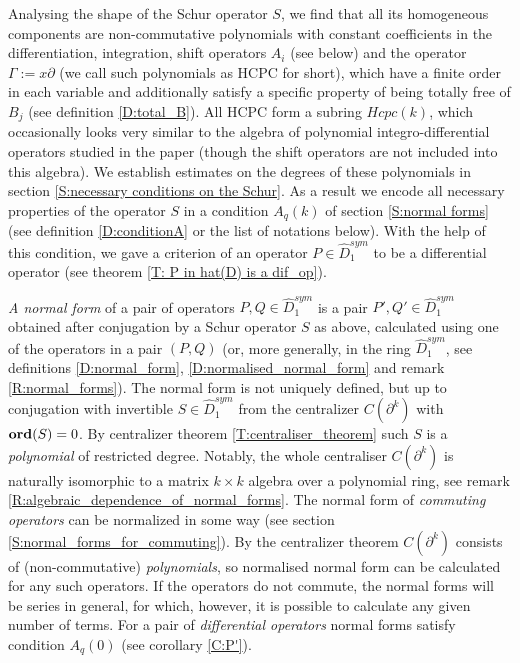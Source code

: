 \documentclass[11pt]{article}
\theoremstyle{definition}
\newcommand{\Ord}{\mathop {\rm \bf ord}}
\theoremstyle{plain}
\numberwithin{equation}{section}
\begin{document}
Analysing the shape of the Schur operator $S$, we find that all its homogeneous components are non-commutative polynomials with constant coefficients in the differentiation, integration, shift operators $A_i$ (see below) and the operator $\Gamma :=x\partial$ (we call such polynomials as HCPC for short), which have a finite order in each variable and additionally satisfy a specific property of being totally free of $B_j$ (see definition \ref{D:total_B}). All HCPC  form a subring $Hcpc(k)$, which occasionally looks very similar to the algebra of polynomial integro-differential operators studied in the paper \cite{Bavula} (though the shift operators are not included into this algebra). We establish estimates on the degrees of these polynomials in section \ref{S:necessary conditions on the Schur}. As a result we encode all necessary  properties of the operator $S$ in a condition $A_q(k)$ of section \ref{S:normal forms} (see  definition \ref{D:conditionA} or the list of notations below). With the help of this condition, we gave a criterion of an operator $P\in \hat{D}_1^{sym}$ to be a differential operator (see theorem \ref{T: P in hat(D) is a dif_op}). 

{\it A normal form} of a pair of operators $P,Q\in \hat{D}_1^{sym}$ is a pair $P', Q' \in  \hat{D}_1^{sym}$ obtained after conjugation by a 
Schur operator $S$ as above, calculated using one of the operators in a pair $(P,Q)$ (or, more generally, in the ring $\hat{D}_1^{sym}$, see definitions \ref{D:normal_form}, \ref{D:normalised_normal_form} and remark \ref{R:normal_forms}). The normal form is not uniquely defined, but up to conjugation with invertible $S\in \hat{D}_1^{sym}$ from the centralizer $C(\partial^k)$  with $\Ord (S)=0$. By centralizer theorem \ref{T:centraliser_theorem}  such $S$ is a {\it polynomial} of restricted degree. Notably, the whole centraliser $C(\partial^k)$ is naturally isomorphic to a matrix $k\times k$ algebra over a polynomial ring, see remark \ref{R:algebraic_dependence_of_normal_forms}.
The normal form of {\it commuting operators} can be normalized in some way (see section \ref{S:normal_forms_for_commuting}). By the centralizer theorem $C(\partial^k)$ consists of (non-commutative) {\it polynomials}, so  normalised normal form can be calculated for any such operators. If the operators do not commute, the normal forms will  be series in general, for which, however, it is possible to calculate any given number of terms. For a pair of {\it differential operators} normal forms satisfy condition $A_q(0)$ (see corollary \ref{C:P'}). 
\end{document}
